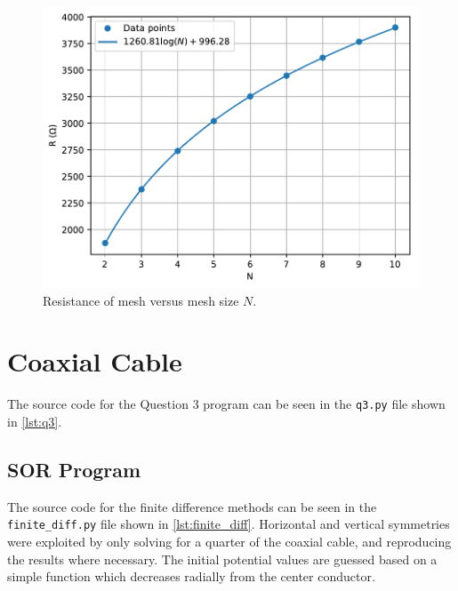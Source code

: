 \documentclass[a4paper,titlepage]{article}
\begin{document}
	\begin{figure}[!htb]
		\centering
		\includegraphics[width=\columnwidth]{plots/q2d.pdf}
		\caption
		{Resistance of mesh versus mesh size $N$.}
		\label{fig:q2d}
	\end{figure}
	
	\section{Coaxial Cable}
	
	The source code for the Question 3 program can be seen in the \texttt{q3.py} file shown in \autoref{lst:q3}.
	
	\subsection{SOR Program}
	
	The source code for the finite difference methods can be seen in the \texttt{finite_diff.py} file shown in \autoref{lst:finite_diff}. Horizontal and vertical symmetries were exploited by only solving for a quarter of the coaxial cable, and reproducing the results where necessary. The initial potential values are guessed based on a simple function which decreases radially from the center conductor.
	
\end{document}
